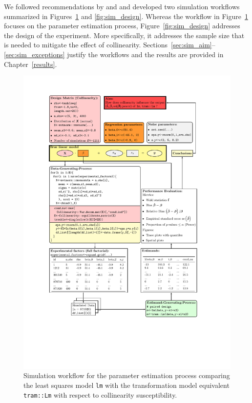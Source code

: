\documentclass[11pt,a4paper,twoside]{book}\usepackage[]{graphicx}\usepackage[]{xcolor}
\begin{document}
We followed recommendations by \cite{Burton2006, Morris2019} and \cite{pawel2022} and developed two simulation workflows summarized in Figures~\ref{fig:sim_para} and \ref{fig:sim_design}. Whereas the workflow in Figure~\ref{fig:sim_para} focuses on the parameter estimation process, Figure~\ref{fig:sim_design} addresses the design of the experiment. More specifically, it addresses the sample size that is needed to mitigate the effect of collinearity. Sections~\ref{sec:sim_aim}--\ref{sec:sim_exceptions} justify the workflows and the results are provided in Chapter~\ref{results}.

\newpage
\begin{figure}[H]
\begin{center}
\hspace*{-1cm}
\includegraphics[width=1.2\textwidth]{../sim_workflow_tikz/flow_para}
\vspace*{-50mm}
\caption{Simulation workflow for the parameter estimation process comparing the least squares model \texttt{lm} with the transformation model equivalent \texttt{tram::Lm} with respect to collinearity susceptibility.}
\label{fig:sim_para}
\end{center}
\end{figure}
\end{document}
